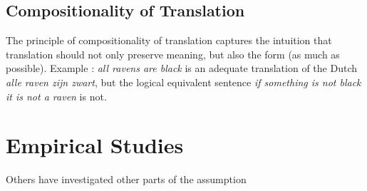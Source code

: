\documentclass{report}
\theoremstyle{indented}
\begin{document}

\subsection{Compositionality of Translation}


The principle of compositionality of translation captures the intuition that translation should not only preserve meaning, but also the form (as much as possible). 
Example \cite{landsbergen1989power}: \textit{all ravens are black} is an adequate translation of the Dutch \textit{alle raven zijn zwart}, but the logical equivalent sentence \textit{if something is not black it is not a raven} is not.











\section{Empirical Studies}

%
Others have investigated other parts of the assumption
\end{document}
